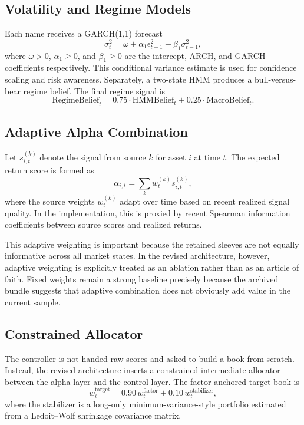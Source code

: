 \documentclass[11pt]{article}
\begin{document}
\subsection{Volatility and Regime Models}

Each name receives a GARCH(1,1) forecast
\[
\sigma_t^2 = \omega + \alpha_1 \epsilon_{t-1}^2 + \beta_1 \sigma_{t-1}^2,
\]
where $\omega > 0$, $\alpha_1 \geq 0$, and $\beta_1 \geq 0$ are the intercept,
ARCH, and GARCH coefficients respectively. This conditional variance estimate
is used for confidence scaling and risk awareness. Separately, a two-state HMM
produces a bull-versus-bear regime belief. The final regime signal is
\[
\text{RegimeBelief}_t =
0.75 \cdot \text{HMMBelief}_t +
0.25 \cdot \text{MacroBelief}_t.
\]

\subsection{Adaptive Alpha Combination}

Let $s^{(k)}_{i,t}$ denote the signal from source $k$ for asset $i$ at time $t$.
The expected return score is formed as
\[
\alpha_{i,t} = \sum_k w^{(k)}_t s^{(k)}_{i,t},
\]
where the source weights $w^{(k)}_t$ adapt over time based on recent realized
signal quality. In the implementation, this is proxied by recent Spearman
information coefficients between source scores and realized returns.

This adaptive weighting is important because the retained sleeves are not
equally informative across all market states. In the revised architecture,
however, adaptive weighting is explicitly treated as an ablation rather than as
an article of faith. Fixed weights remain a strong baseline precisely because
the archived bundle suggests that adaptive combination does not obviously add
value in the current sample.

\subsection{Constrained Allocator}

The controller is not handed raw scores and asked to build a book from scratch.
Instead, the revised architecture inserts a constrained intermediate allocator
between the alpha layer and the control layer. The factor-anchored target book
is
\[
w_t^{\text{target}} =
0.90\,w_t^{\text{factor}} +
0.10\,w_t^{\text{stabilizer}},
\]
where the stabilizer is a long-only minimum-variance-style portfolio estimated
from a Ledoit--Wolf shrinkage covariance matrix.
\end{document}
